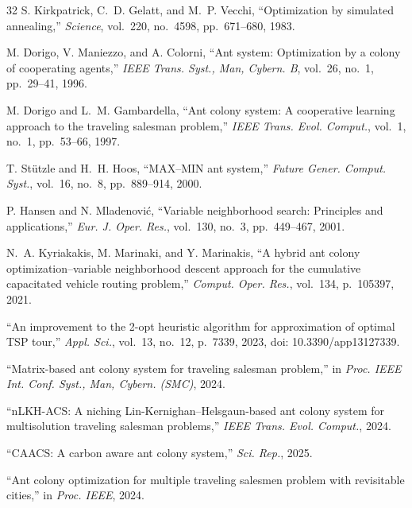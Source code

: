 \documentclass[lettersize,journal]{IEEEtran}
\begin{document}
\begin{thebibliography}{32}
S. Kirkpatrick, C.~D. Gelatt, and M.~P. Vecchi, ``Optimization by simulated annealing,'' \textit{Science}, vol.~220, no.~4598, pp.~671--680, 1983.


M. Dorigo, V. Maniezzo, and A. Colorni, ``Ant system: Optimization by a colony of cooperating agents,'' \textit{IEEE Trans. Syst., Man, Cybern. B}, vol.~26, no.~1, pp.~29--41, 1996.


M. Dorigo and L.~M. Gambardella, ``Ant colony system: A cooperative learning approach to the traveling salesman problem,'' \textit{IEEE Trans. Evol. Comput.}, vol.~1, no.~1, pp.~53--66, 1997.


T. St\"utzle and H.~H. Hoos, ``MAX--MIN ant system,'' \textit{Future Gener. Comput. Syst.}, vol.~16, no.~8, pp.~889--914, 2000.


P. Hansen and N. Mladenovi\'c, ``Variable neighborhood search: Principles and applications,'' \textit{Eur. J. Oper. Res.}, vol.~130, no.~3, pp.~449--467, 2001.


N.~A. Kyriakakis, M. Marinaki, and Y. Marinakis, ``A hybrid ant colony optimization--variable neighborhood descent approach for the cumulative capacitated vehicle routing problem,'' \textit{Comput. Oper. Res.}, vol.~134, p.~105397, 2021.


``An improvement to the 2-opt heuristic algorithm for approximation of optimal TSP tour,'' \textit{Appl. Sci.}, vol.~13, no.~12, p.~7339, 2023, doi: 10.3390/app13127339.


``Matrix-based ant colony system for traveling salesman problem,'' in \textit{Proc. IEEE Int. Conf. Syst., Man, Cybern. (SMC)}, 2024.


``nLKH-ACS: A niching Lin-Kernighan--Helsgaun-based ant colony system for multisolution traveling salesman problems,'' \textit{IEEE Trans. Evol. Comput.}, 2024.


``CAACS: A carbon aware ant colony system,'' \textit{Sci. Rep.}, 2025.


``Ant colony optimization for multiple traveling salesmen problem with revisitable cities,'' in \textit{Proc. IEEE}, 2024.


\end{thebibliography}
\end{document}

